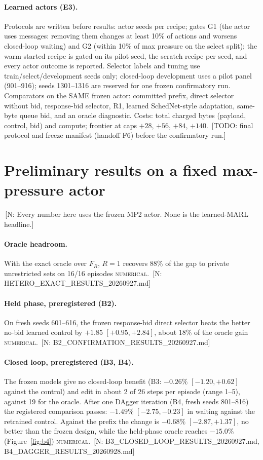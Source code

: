 \documentclass[11pt]{article}
\theoremstyle{definition}
\newcommand{\NUM}{\textsc{numerical}}
\newif\ifshownotes\shownotestrue
\newcommand{\NOTE}[1]{\ifshownotes{\color{notecol}\,\textsf{\footnotesize[N: #1]}}\fi}
\newcommand{\TODO}[1]{\ifshownotes{\color{todocol}\,\textsf{\footnotesize[TODO: #1]}}\fi}
\begin{document}
\paragraph{Learned actors (E3).} Protocols are written before results: actor seeds per recipe; gates G1
(the actor uses messages: removing them changes at least 10\% of actions and worsens closed-loop
waiting) and G2 (within 10\% of max pressure on the select split); the warm-started recipe is gated
on its pilot seed, the scratch recipe per seed, and every actor outcome is reported. Selector labels
and tuning use train/select/development seeds only; closed-loop development uses a pilot panel
(901--916); seeds 1301--1316 are reserved for one frozen confirmatory run. Comparators on the SAME
frozen actor: committed prefix, direct selector without bid, response-bid selector, R1, learned
SchedNet-style adaptation, same-byte queue bid, and an oracle diagnostic. Costs: total charged bytes
(payload, control, bid) and compute; frontier at caps $+28$, $+56$, $+84$, $+140$.
\TODO{final protocol and freeze manifest (handoff F6) before the confirmatory run.}

\section{Preliminary results on a fixed max-pressure actor}\label{sec:prelim}
\NOTE{Every number here uses the frozen MP2 actor. None is the learned-MARL headline.}

\paragraph{Oracle headroom.} With the exact oracle over $F_R$, $R=1$ recovers 88\% of the gap to
private unrestricted sets on 16/16 episodes \NUM.
\NOTE{HETERO\_EXACT\_RESULTS\_20260927.md}

\paragraph{Held phase, preregistered (B2).} On fresh seeds 601--616, the frozen response-bid
direct selector beats the better no-bid learned control by $+1.85$ $[+0.95,+2.84]$, about 18\% of
the oracle gain \NUM. \NOTE{B2\_CONFIRMATION\_RESULTS\_20260927.md}

\paragraph{Closed loop, preregistered (B3, B4).} The frozen models give no closed-loop benefit
(B3: $-0.26\%$ $[-1.20,+0.62]$ against the control) and edit in about 2 of 26 steps per episode (range 1--5), against 19 for the oracle. After one
DAgger iteration (B4, fresh seeds 801--816) the registered comparison passes: $-1.49\%$
$[-2.75,-0.23]$ in waiting against the retrained control. Against the prefix the change is
$-0.68\%$ $[-2.87,+1.37]$, no better than the frozen design, while the held-phase oracle reaches
$-15.0\%$ (Figure~\ref{fig:b4}) \NUM.
\NOTE{B3\_CLOSED\_LOOP\_RESULTS\_20260927.md, B4\_DAGGER\_RESULTS\_20260928.md}
\end{document}
